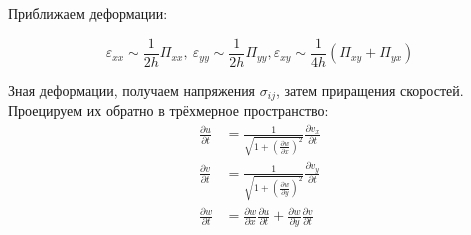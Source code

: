 \documentclass[12pt,a4paper,fleqn]{article}
\begin{document}
Приближаем деформации:

\begin{equation}
	\varepsilon_{xx} \sim \frac{1}{2h}\Pi_{xx},\ \varepsilon_{yy} \sim \frac{1}{2h}\Pi_{yy}, 
		\varepsilon_{xy} \sim \frac{1}{4h}(\Pi_{xy} + \Pi_{yx})
\end{equation}

Зная деформации, получаем напряжения $\sigma_{ij}$, затем приращения скоростей. Проецируем их обратно в трёхмерное пространство:
\begin{align}
	\frac{\partial u}{\partial t} &= \frac{1}{\sqrt{1 + \left( \frac{\partial w}{\partial x} \right)^2 }} \frac{\partial v_x}{\partial t} \\
	\frac{\partial v}{\partial t} &= \frac{1}{\sqrt{1 + \left( \frac{\partial w}{\partial y} \right)^2 }} \frac{\partial v_y}{\partial t} \\
	\frac{\partial w}{\partial t} &= \frac{\partial w}{\partial x} \frac{\partial u}{\partial t} 
			+ \frac{\partial w}{\partial y} \frac{\partial v}{\partial t}
\end{align}
 
\end{document}
